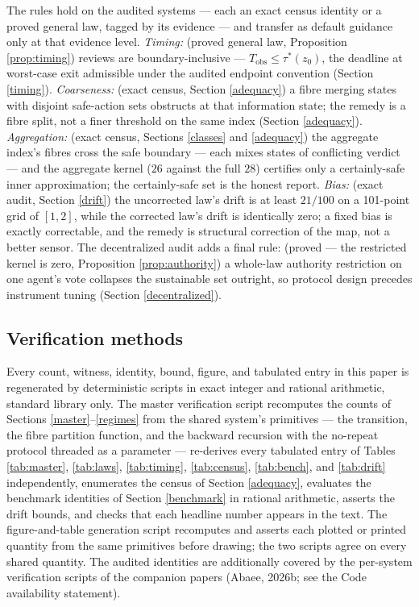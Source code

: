 \documentclass[10pt,twocolumn]{article}
\theoremstyle{definition}
\begin{document}
The rules hold on the audited systems --- each an exact census identity or a proved general law, tagged by its evidence --- and transfer as default guidance only at that evidence level. \emph{Timing:} (proved general law, Proposition \ref{prop:timing}) reviews are boundary-inclusive ---
\(T_{\mathrm{obs}} \le \tau^{*}(z_0)\), the deadline at worst-case exit admissible under the audited endpoint convention (Section \ref{timing}). \emph{Coarseness:} (exact census, Section \ref{adequacy}) a fibre
merging states with disjoint safe-action sets obstructs at that
information state; the remedy is a fibre split, not a finer threshold
on the same index (Section \ref{adequacy}). \emph{Aggregation:} (exact census, Sections \ref{classes} and \ref{adequacy}) the aggregate index's fibres cross the safe boundary --- each mixes states of conflicting verdict --- and the aggregate kernel (\(26\) against the full \(28\)) certifies only a certainly-safe inner approximation; the certainly-safe set is the honest report.
\emph{Bias:} (exact audit, Section \ref{drift}) the uncorrected law's drift is at least \(21/100\) on a
101-point grid of \([1,2]\), while the corrected law's drift is
identically zero; a fixed bias is exactly correctable, and the remedy is
structural correction of the map, not a better sensor. The decentralized audit adds a final rule: (proved --- the restricted kernel is zero, Proposition \ref{prop:authority}) a whole-law authority restriction on one agent's vote collapses the sustainable set outright, so protocol
design precedes instrument tuning (Section \ref{decentralized}).

\subsection{Verification methods}\label{methods}

Every count, witness, identity, bound, figure, and tabulated entry in
this paper is regenerated by deterministic scripts in exact integer and
rational arithmetic, standard library only. The master verification
script recomputes the counts of Sections \ref{master}--\ref{regimes}
from the shared system's primitives --- the transition, the fibre
partition function, and the backward recursion with the no-repeat
protocol threaded as a parameter --- re-derives every tabulated entry of
Tables \ref{tab:master}, \ref{tab:laws}, \ref{tab:timing},
\ref{tab:census}, \ref{tab:bench}, and \ref{tab:drift} independently,
enumerates the census of Section \ref{adequacy}, evaluates the
benchmark identities of Section \ref{benchmark} in rational
arithmetic, asserts the drift bounds, and checks that each headline
number appears in the text. The figure-and-table generation script
recomputes and asserts each plotted or printed quantity from the same
primitives before drawing; the two scripts agree on every shared
quantity. The audited identities are additionally covered by the
per-system verification scripts of the companion papers (Abaee, 2026b;
see the Code availability statement).
\end{document}
